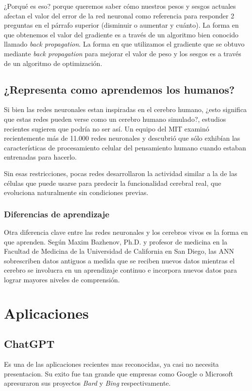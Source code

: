 \documentclass[runningheads]{llncs} %
\begin{document}
¿Porqué es eso? porque queremos saber cómo nuestros pesos y sesgos actuales afectan 
el valor del error de la red neuronal como referencia para responder 2 preguntas 
en el párrafo superior (disminuir o aumentar y cuánto). La forma en que obtenemos el valor 
del gradiente es a través de un algoritmo bien conocido llamado \textit{back propagation}. 
La forma en que utilizamos el gradiente que se obtuvo mediante \textit{back propagation} 
para mejorar el valor de peso y los sesgos es a través de un algoritmo de optimización.
\cite{backpropagation}

\subsection{¿Representa como aprendemos los humanos?}
Si bien las redes neuronales estan inspiradas en el cerebro humano, ¿esto significa 
que estas redes pueden verse como un cerebro humano simulado?, estudios recientes sugieren 
que podría no ser así. Un equipo del MIT examinó recientemente más de 11.000 redes neuronales 
y descubrió que sólo exhibían las características de procesamiento celular del pensamiento 
humano cuando estaban entrenadas para hacerlo. 

Sin esas restricciones, pocas redes desarrollaron la actividad similar a la de las células 
que puede usarse para predecir la funcionalidad cerebral real, que evoluciona naturalmente 
sin condiciones previas. \cite{NNvsANN}

\subsubsection{Diferencias de aprendizaje} 
Otra diferencia clave entre las redes neuronales y los cerebros vivos es la forma 
en que aprenden. Según Maxim Bazhenov, Ph.D. y profesor de medicina en la 
Facultad de Medicina de la Universidad de California en San Diego, 
las ANN sobrescriben datos antiguos a medida que se reciben nuevos datos mientras 
el cerebro se involucra en un aprendizaje continuo e incorpora nuevos datos para lograr 
mayores niveles de comprensión. \cite{NNvsANN}

\section{Aplicaciones}
\subsection{ChatGPT}
Es una de las aplicaciones recientes mas reconocidas, ya casi no necesita presentacion.
Su exito fue tan grande que empresas como Google o Microsoft apresuraron sus proyectos
\textit{Bard} y \textit{Bing} respectivamente.
\end{document}
